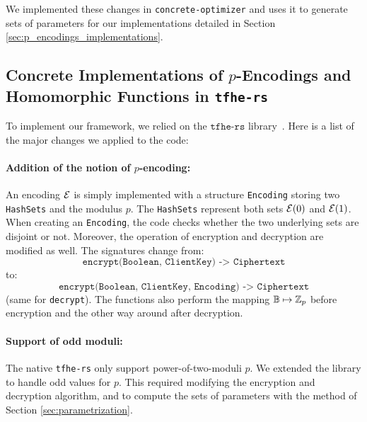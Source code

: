 We implemented these changes in \texttt{concrete-optimizer} and uses it to generate sets of parameters for our implementations detailed in Section \ref{sec:p_encodings_implementations}.

\subsection{Concrete Implementations of $p$-Encodings and Homomorphic Functions in \texttt{tfhe-rs}}
\label{sec:library}

To implement our framework, we relied on the $\texttt{tfhe-rs}$ library~\cite{tfhe-rs}. Here is a list of the major changes we applied to the code:

\paragraph{Addition of the notion of $p$-encoding: } An encoding $\mathcal{E}$ is simply implemented with a structure \texttt{Encoding} storing two \texttt{HashSets} and the modulus $p$. The \texttt{HashSets} represent both sets $\mathcal{E}(0)$ and $\mathcal{E}(1)$. When creating an \texttt{Encoding}, the code checks whether the two underlying sets are disjoint or not. Moreover, the operation of encryption and decryption are modified as well. The signatures change from:\[\texttt{encrypt(Boolean, ClientKey) -> Ciphertext}\] to: \[\texttt{encrypt(Boolean, ClientKey, Encoding) -> Ciphertext}\] (same for \texttt{decrypt}). The functions also perform the mapping $\mathbb{B} \mapsto \mathbb{Z}_p$ before encryption and the other way around after decryption.


\paragraph{Support of odd moduli: } The native \texttt{tfhe-rs} only support power-of-two-moduli $p$. We extended the library to handle odd values for $p$. This required modifying the encryption and decryption algorithm, and to compute the sets of parameters with the method of Section \ref{sec:parametrization}.


